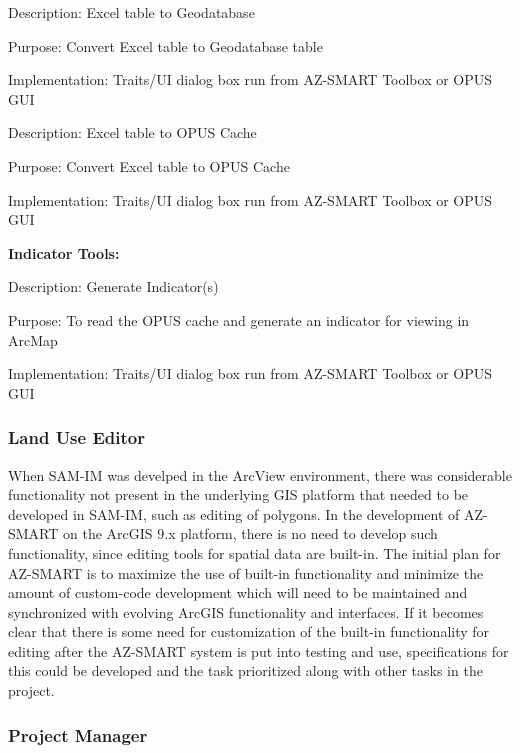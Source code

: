 Description: Excel table to Geodatabase

Purpose: Convert Excel table to Geodatabase table

Implementation: Traits/UI dialog box run from AZ-SMART Toolbox or OPUS GUI

\bigskip

Description: Excel table to OPUS Cache

Purpose: Convert Excel table to OPUS Cache

Implementation: Traits/UI dialog box run from AZ-SMART Toolbox or OPUS GUI

\bigskip

\textbf{Indicator Tools:}

\bigskip

Description: Generate Indicator(s)

Purpose: To read the OPUS cache and generate an indicator for viewing in ArcMap

Implementation: Traits/UI dialog box run from AZ-SMART Toolbox or OPUS GUI

\bigskip

\subsubsection{Land Use Editor}
When SAM-IM was develped in the ArcView environment, there was considerable functionality not present in the underlying GIS platform that needed to be developed in SAM-IM, such as editing of polygons.  In the development of AZ-SMART on the ArcGIS 9.x platform, there is no need to develop such functionality, since editing tools for spatial data are built-in.  The initial plan for AZ-SMART is to maximize the use of built-in functionality and minimize the amount of custom-code development which will need to be maintained and synchronized with evolving ArcGIS functionality and interfaces.  If it becomes clear that there is some need for customization of the built-in functionality for editing after the AZ-SMART system is put into testing and use, specifications for this could be developed and the task prioritized along with other tasks in the project.


\subsubsection{Project Manager}

